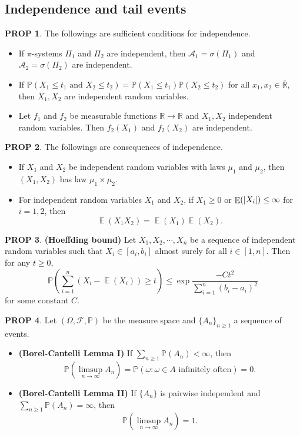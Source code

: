 \documentclass[hidelinks,11pt]{article}
\theoremstyle{definition}
\theoremstyle{dotless}
\newtheorem{prop}{PROP}[section]
\theoremstyle{remark}
\DeclareMathOperator{\E}{\mathbb{E}}
\DeclareMathOperator{\1}{\mathbf{1}}
\begin{document}
\subsection{Independence and tail events}

\begin{prop}The followings are sufficient conditions for independence.\begin{itemize}
    \item If $\pi$-systems $\Pi_1$ and $\Pi_2$ are  independent, then $\mathcal{A}_1=\sigma(\Pi_1)$ and $\mathcal{A}_2=\sigma(\Pi_2)$ are independent.
    \item If $\mathbb{P}(X_1\leq t_1\textrm{ and }X_2\leq t_2)=\mathbb{P}(X_1\leq t_1)\mathbb{P}(X_2\leq t_2)$ for all $x_1,x_2\in\overline{\mathbb{R}}$, then $X_1,X_2$ are independent random variables.
    \item Let $f_1$ and $f_2$ be measurable functions $\mathbb{R}\to\mathbb{R}$ and $X_1,X_2$ independent random variables. Then $f_2(X_1)$ and $f_2(X_2)$ are independent.
\end{itemize}
\end{prop}

\begin{prop}
The followings are consequences of independence.\begin{itemize}
    \item If $X_1$ and $X_2$ be independent random variables with laws $\mu_1$ and $\mu_2$, then $(X_1,X_2)$ has law $\mu_1\times\mu_2$.
    \item For independent random variables $X_1$ and $X_2$, if $X_1\geq0$ or $\E(\abs{X_i})\leq\infty$ for $i=1,2$, then
    \[\E(X_1X_2)=\E(X_1)\E(X_2).\]
\end{itemize}
\end{prop}

\begin{prop}\textup{\textbf{(Hoeffding bound)}} Let $X_1,X_2,\cdots,X_n$ be a sequence of independent random variables such that $X_i\in[a_i,b_i]$ almost surely for all $i\in[1,n]$. Then for any $t\geq0$,
\[\mathbb{P}\left(\sum_{i=1}^n(X_i-\E(X_i))\geq t\right)\leq\exp{\frac{-Ct^2}{\sum_{i=1}^n(b_i-a_i)^2}}\]
for some constant $C$.
\end{prop}

\begin{prop}Let $(\Omega,\mathcal{F},\mathbb{P})$ be the measure space and $\{A_n\}_{n\geq1}$ a sequence of events.\begin{itemize}
    \item\textup{\textbf{(Borel-Cantelli Lemma I)}} If $\sum_{n\geq1}\mathbb{P}(A_n)<\infty$, then
\[\mathbb{P}(\limsup_{n\to\infty}A_n)=\mathbb{P}(\omega:\omega\in A\textrm{ infinitely often})=0.\]
    \item\textup{\textbf{(Borel-Cantelli Lemma II)}} If $\{A_n\}$ is pairwise independent and $\sum_{n\geq1}\mathbb{P}(A_n)=\infty$, then
    \[\mathbb{P}(\limsup_{n\to\infty}A_n)=1.\]
\end{itemize}
\end{prop}
\end{document}
